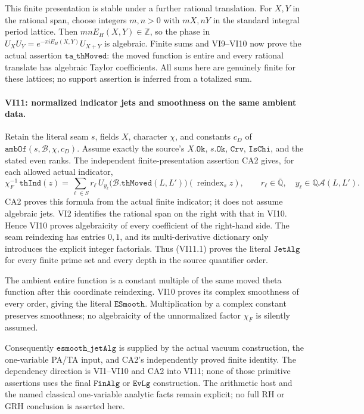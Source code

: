 This finite presentation is stable under a further rational
translation. For \(X,Y\) in the rational span, choose
integers \(m,n>0\) with \(mX,nY\) in the standard integral
period lattice. Then \(mnE_H(X,Y)\in\mathbb Z\), so the
phase in \(U_XU_Y=e^{-\pi iE_H(X,Y)}U_{X+Y}\) is algebraic.
Finite sums and VI9--VI10 now prove the actual assertion
\(\texttt{ta\_thMoved}\): the moved function is entire and
every rational translate has algebraic Taylor coefficients.
All sums here are genuinely finite for these lattices;
no support assertion is inferred from a totalized sum.

\paragraph{VI11: normalized indicator jets and smoothness on the same ambient data.}
Retain the literal seam \(s\), fields \(X\), character \(\chi\),
and constants \(c_D\) of \(\texttt{ambOf}(s,\mathscr B,\chi,c_D)\).
Assume exactly the source's \(X.\texttt{Ok}\), \(s.\texttt{Ok}\),
\(\texttt{Crv}\), \(\texttt{IsChi}\), and the stated even ranks.
The independent finite-presentation assertion CA2 gives, for
each allowed actual indicator,
\[
 \chi_F^{-1}\,\texttt{thInd}(z)
       =\sum_{\ell\in S} r_\ell\,
           U_{y_\ell}\bigl(\mathscr B.\texttt{thMoved}(L,L')\bigr)
                    (\operatorname{reindex}_s z),
 \qquad r_\ell\in\overline{\mathbb Q},
 \quad y_\ell\in\mathbb Q\mathcal A(L,L').
 \tag{VI11.1}
\]
CA2 proves this formula from the actual finite indicator;
it does not assume algebraic jets. VI2 identifies the
rational span on the right with that in VI10. Hence VI10
proves algebraicity of every coefficient of the right-hand
side. The seam reindexing has entries \(0,1\), and its
multi-derivative dictionary only introduces the explicit
integer factorials. Thus (VI11.1) proves the literal
\(\texttt{JetAlg}\) for every finite prime set and every
depth in the source quantifier order.

The ambient entire function is a constant multiple of the
same moved theta function after this coordinate reindexing.
VI10 proves its complex smoothness of every order, giving
the literal \(\texttt{ESmooth}\). Multiplication by a complex
constant preserves smoothness; no algebraicity of the
unnormalized factor \(\chi_F\) is silently assumed.

Consequently \(\texttt{esmooth\_jetAlg}\) is supplied by the
actual vacuum construction, the one-variable PA/TA input,
and CA2's independently proved finite identity. The dependency
direction is VI1--VI10 and CA2 into VI11; none of those
primitive assertions uses the final \(\texttt{FinAlg}\) or
\(\texttt{EvLg}\) construction. The arithmetic host and the
named classical one-variable analytic facts remain explicit;
no full RH or GRH conclusion is asserted here.
